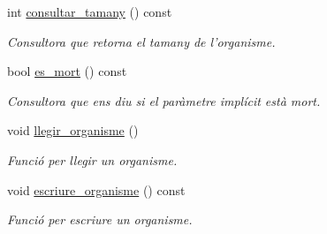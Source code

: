 \begin{DoxyCompactItemize}
int \hyperlink{class_organisme_a2232a1a2596db03697e6345fff587621}{consultar\-\_\-tamany} () const 
\begin{DoxyCompactList}\small\item\em Consultora que retorna el tamany de l'organisme. \end{DoxyCompactList}\item 
bool \hyperlink{class_organisme_abe3c4923cc5641e48724312bc298c8a9}{es\-\_\-mort} () const 
\begin{DoxyCompactList}\small\item\em Consultora que ens diu si el paràmetre implícit està mort. \end{DoxyCompactList}\item 
void \hyperlink{class_organisme_a056a9402130c7081b608838ba9ef2a30}{llegir\-\_\-organisme} ()
\begin{DoxyCompactList}\small\item\em Funció per llegir un organisme. \end{DoxyCompactList}\item 
void \hyperlink{class_organisme_ab359a3109ec7ff96018bbe08d97043cf}{escriure\-\_\-organisme} () const 
\begin{DoxyCompactList}\small\item\em Funció per escriure un organisme. \end{DoxyCompactList}\end{DoxyCompactItemize}
